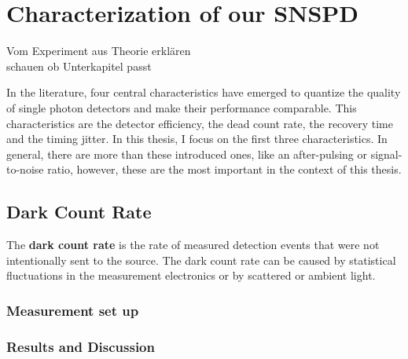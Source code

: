 
\graphicspath{{/Users/maxim.re/Studium/Physik B.Sc./Semester_8_SS24/Proseminar/Figs Single Photon Detection/}}

\chapter{Characterization of our SNSPD}
\label{sec:SNSPD_Characterization}
Vom Experiment aus Theorie erklären \\ schauen ob Unterkapitel passt


In the literature, four central characteristics have emerged to quantize the quality of single photon detectors and
make their performance comparable.
This characteristics are the detector efficiency, the dead count rate, the recovery time and the timing jitter.
In this thesis, I focus on the first three characteristics.
In general, there are more than these introduced ones,
like an after-pulsing or signal-to-noise ratio, however, these are the most important in the context of this thesis.

\section{Dark Count Rate}
The \textbf{dark count rate} is the rate of measured detection events that were not intentionally sent to the source.
The dark count rate can be caused by statistical fluctuations in the measurement electronics
or by scattered or ambient light. \\

\subsection*{Measurement set up}
\subsection*{Results and Discussion}


